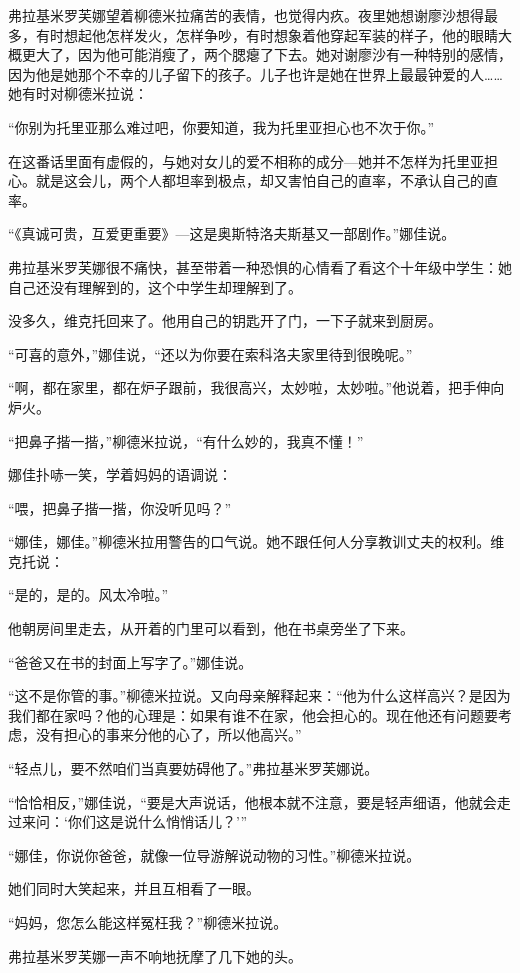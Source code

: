 弗拉基米罗芙娜望着柳德米拉痛苦的表情，也觉得内疚。夜里她想谢廖沙想得最多，有时想起他怎样发火，怎样争吵，有时想象着他穿起军装的样子，他的眼睛大概更大了，因为他可能消瘦了，两个腮瘪了下去。她对谢廖沙有一种特别的感情，因为他是她那个不幸的儿子留下的孩子。儿子也许是她在世界上最最钟爱的人……她有时对柳德米拉说：

“你别为托里亚那么难过吧，你要知道，我为托里亚担心也不次于你。”

在这番话里面有虚假的，与她对女儿的爱不相称的成分—她并不怎样为托里亚担心。就是这会儿，两个人都坦率到极点，却又害怕自己的直率，不承认自己的直率。

“《真诚可贵，互爱更重要》—这是奥斯特洛夫斯基又一部剧作。”娜佳说。

弗拉基米罗芙娜很不痛快，甚至带着一种恐惧的心情看了看这个十年级中学生：她自己还没有理解到的，这个中学生却理解到了。

没多久，维克托回来了。他用自己的钥匙开了门，一下子就来到厨房。

“可喜的意外，”娜佳说，“还以为你要在索科洛夫家里待到很晚呢。”

“啊，都在家里，都在炉子跟前，我很高兴，太妙啦，太妙啦。”他说着，把手伸向炉火。

“把鼻子揩一揩，”柳德米拉说，“有什么妙的，我真不懂！”

娜佳扑哧一笑，学着妈妈的语调说：

“喂，把鼻子揩一揩，你没听见吗？”

“娜佳，娜佳。”柳德米拉用警告的口气说。她不跟任何人分享教训丈夫的权利。维克托说：

“是的，是的。风太冷啦。”

他朝房间里走去，从开着的门里可以看到，他在书桌旁坐了下来。

“爸爸又在书的封面上写字了。”娜佳说。

“这不是你管的事。”柳德米拉说。又向母亲解释起来：“他为什么这样高兴？是因为我们都在家吗？他的心理是：如果有谁不在家，他会担心的。现在他还有问题要考虑，没有担心的事来分他的心了，所以他高兴。”

“轻点儿，要不然咱们当真要妨碍他了。”弗拉基米罗芙娜说。

“恰恰相反，”娜佳说，“要是大声说话，他根本就不注意，要是轻声细语，他就会走过来问：‘你们这是说什么悄悄话儿？’”

“娜佳，你说你爸爸，就像一位导游解说动物的习性。”柳德米拉说。

她们同时大笑起来，并且互相看了一眼。

“妈妈，您怎么能这样冤枉我？”柳德米拉说。

弗拉基米罗芙娜一声不响地抚摩了几下她的头。

